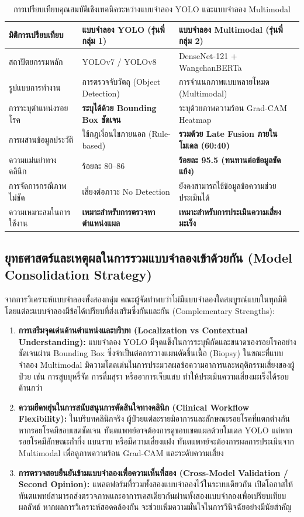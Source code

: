 \begin{table}[htbp]
\centering
\small
\caption{การเปรียบเทียบคุณสมบัติเชิงเทคนิคระหว่างแบบจำลอง YOLO และแบบจำลอง Multimodal}
\label{tab:model_comparison}
\begin{tabular}{p{3.5cm}p{5.0cm}p{5.0cm}}
\toprule
\textbf{มิติการเปรียบเทียบ} & \textbf{แบบจำลอง YOLO (รุ่นพี่กลุ่ม 1)} & \textbf{แบบจำลอง Multimodal (รุ่นพี่กลุ่ม 2)} \\
\midrule
สถาปัตยกรรมหลัก & YOLOv7 / YOLOv8 & DenseNet-121 + WangchanBERTa \\
รูปแบบการทำงาน & การตรวจจับวัตถุ (Object Detection) & การจำแนกภาพแบบหลายโหมด (Multimodal) \\
การระบุตำแหน่งรอยโรค & \textbf{ระบุได้ด้วย Bounding Box ชัดเจน} & ระบุด้วยภาพความร้อน Grad-CAM Heatmap \\
การผสานข้อมูลประวัติ & ใช้กฎเงื่อนไขภายนอก (Rule-based) & \textbf{รวมด้วย Late Fusion ภายในโมเดล (60:40)} \\
ความแม่นยำทางคลินิก & ร้อยละ 80--86 & \textbf{ร้อยละ 95.5 (ทนทานต่อข้อมูลขัดแย้ง)} \\
การจัดการกรณีภาพไม่ชัด & เสี่ยงต่อภาวะ No Detection & ยังคงสามารถใช้ข้อมูลข้อความช่วยประเมินได้ \\
ความเหมาะสมในการใช้งาน & \textbf{เหมาะสำหรับการตรวจหาตำแหน่งแผล} & \textbf{เหมาะสำหรับการประเมินความเสี่ยงมะเร็ง} \\
\bottomrule
\end{tabular}
\end{table}

\subsection{ยุทธศาสตร์และเหตุผลในการรวมแบบจำลองเข้าด้วยกัน (Model Consolidation Strategy)}
จากการวิเคราะห์แบบจำลองทั้งสองกลุ่ม คณะผู้จัดทำพบว่าไม่มีแบบจำลองใดสมบูรณ์แบบในทุกมิติ โดยแต่ละแบบจำลองมีข้อได้เปรียบที่ส่งเสริมซึ่งกันและกัน (Complementary Strengths):
\begin{enumerate}
    \item \textbf{การเสริมจุดเด่นด้านตำแหน่งและบริบท (Localization vs Contextual Understanding):} แบบจำลอง YOLO มีจุดแข็งในการระบุพิกัดและขนาดของรอยโรคอย่างชัดเจนผ่าน Bounding Box ซึ่งจำเป็นต่อการวางแผนตัดชิ้นเนื้อ (Biopsy) ในขณะที่แบบจำลอง Multimodal มีความโดดเด่นในการประมวลผลข้อความอาการและพฤติกรรมเสี่ยงของผู้ป่วย เช่น การสูบบุหรี่จัด การดื่มสุรา หรืออาการเจ็บแสบ ทำให้ประเมินความเสี่ยงมะเร็งได้รอบด้านกว่า
    \item \textbf{ความยืดหยุ่นในการสนับสนุนการตัดสินใจทางคลินิก (Clinical Workflow Flexibility):} ในบริบทคลินิกจริง ผู้ป่วยแต่ละรายมีอาการและลักษณะรอยโรคที่แตกต่างกัน หากรอยโรคมีขอบเขตชัดเจน ทันตแพทย์อาจต้องการดูขอบเขตแผลด้วยโมเดล YOLO แต่หากรอยโรคมีลักษณะก้ำกึ่ง แบนราบ หรือมีความเสี่ยงแฝง ทันตแพทย์จะต้องการผลการประเมินจาก Multimodal เพื่อดูภาพความร้อน Grad-CAM และระดับความเสี่ยง
    \item \textbf{การตรวจสอบยืนยันข้ามแบบจำลองเพื่อความเห็นที่สอง (Cross-Model Validation / Second Opinion):} แพลตฟอร์มที่รวมทั้งสองแบบจำลองไว้ในระบบเดียวกัน เปิดโอกาสให้ทันตแพทย์สามารถส่งตรวจภาพและอาการเคสเดียวกันผ่านทั้งสองแบบจำลองเพื่อเปรียบเทียบผลลัพธ์ หากผลการวิเคราะห์สอดคล้องกัน จะช่วยเพิ่มความมั่นใจในการวินิจฉัยอย่างมีนัยสำคัญ
\end{enumerate}

